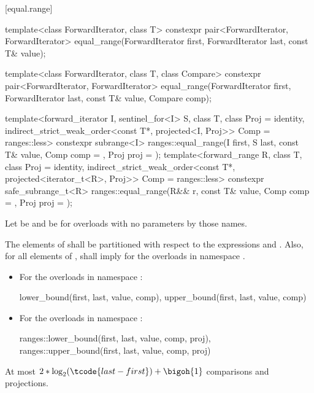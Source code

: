 [equal.range]{}

%
\begin{itemdecl}
template<class ForwardIterator, class T>
  constexpr pair<ForwardIterator, ForwardIterator>
    equal_range(ForwardIterator first,
                ForwardIterator last, const T& value);

template<class ForwardIterator, class T, class Compare>
  constexpr pair<ForwardIterator, ForwardIterator>
    equal_range(ForwardIterator first,
                ForwardIterator last, const T& value,
                Compare comp);

template<forward_iterator I, sentinel_for<I> S, class T, class Proj = identity,
         indirect_strict_weak_order<const T*, projected<I, Proj>> Comp = ranges::less>
  constexpr subrange<I>
    ranges::equal_range(I first, S last, const T& value, Comp comp = {}, Proj proj = {});
template<forward_range R, class T, class Proj = identity,
         indirect_strict_weak_order<const T*, projected<iterator_t<R>, Proj>> Comp =
           ranges::less>
  constexpr safe_subrange_t<R>
    ranges::equal_range(R&& r, const T& value, Comp comp = {}, Proj proj = {});
\end{itemdecl}

\begin{itemdescr}
\pnum
Let  be  and
 be 
for overloads with no parameters by those names.

\pnum
\requires
The elements  of 
shall be partitioned with respect to the expressions
 and
.
Also, for all elements  of \tcode{[first, last)},
 shall imply 
for the overloads in namespace .

\pnum
\returns
\begin{itemize}
\item
For the overloads in namespace :
\begin{codeblock}
{lower_bound(first, last, value, comp),
 upper_bound(first, last, value, comp)}
\end{codeblock}
\item
For the overloads in namespace :
\begin{codeblock}
{ranges::lower_bound(first, last, value, comp, proj),
 ranges::upper_bound(first, last, value, comp, proj)}
\end{codeblock}
\end{itemize}

\pnum
\complexity
At most
$2 * \log_2(\tcode{last - first}) + \bigoh{1}$ comparisons and projections.
\end{itemdescr}

